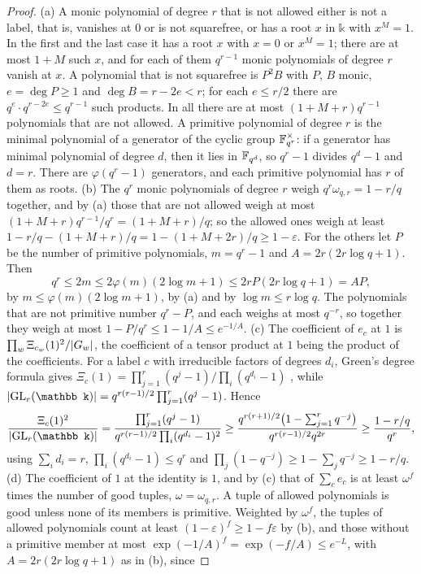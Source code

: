 \begin{proof}
(a) A monic polynomial of degree $r$ that is not allowed either is not a label, that is, vanishes at $0$ or is not squarefree, or has a root $x$ in $\mathbb k$ with $x^M=1$. In the first and the last case it has
a root $x$ with $x=0$ or $x^M=1$; there are at most $1+M$ such $x$, and for each of them $q^{r-1}$ monic polynomials of degree $r$ vanish at $x$. A polynomial that is not squarefree is $P^2B$ with $P$, $B$
monic, $e=\deg P\ge1$ and $\deg B=r-2e<r$; for each $e\le r/2$ there are $q^e\cdot q^{r-2e}\le q^{r-1}$ such products. In all there are at most $(1+M+r)q^{r-1}$ polynomials that are not allowed. A primitive
polynomial of degree $r$ is the minimal polynomial of a generator of the cyclic group $\mathbb{F}_{q^r}^\times$: if a generator has minimal polynomial of degree $d$, then it lies in $\mathbb{F}_{q^d}$, so $q^r-1$ divides $q^d-1$ and
$d=r$. There are $\varphi(q^r-1)$ generators, and each primitive polynomial has $r$ of them as roots.
(b) The $q^r$ monic polynomials of degree $r$ weigh $q^r\omega_{q,r}=1-r/q$ together, and by (a) those that are not allowed weigh at most $(1+M+r)q^{r-1}/q^r=(1+M+r)/q$; so the allowed ones weigh at least
$1-r/q-(1+M+r)/q=1-(1+M+2r)/q\ge1-\varepsilon$. For the others let $P$ be the number of primitive polynomials, $m=q^r-1$ and $A=2r(2r\log q+1)$. Then
\[
  q^r\le2m\le2\varphi(m)(2\log m+1)\le2rP(2r\log q+1)=AP,
\]
by $m\le\varphi(m)(2\log m+1)$, by (a) and by $\log m\le r\log q$. The polynomials that are not primitive number $q^r-P$, and each weighs at most $q^{-r}$, so together they weigh at most $1-P/q^r\le1-1/A\le e^{-1/A}$.
(c) The coefficient of $e_c$ at $1$ is $\prod_w\Xi_{c_w}(1)^2/\lvert G_w\rvert$, the coefficient of a tensor product at $1$ being the product of the coefficients. For a label $c$ with irreducible factors of degrees $d_i$, Green's degree formula gives
$\Xi_c(1)=\prod_{j=1}^r(q^j-1)/\prod_i(q^{d_i}-1)$ \cite{Green1955}, while $\abs{\GL_r(\mathbb k)}=q^{r(r-1)/2}\prod_{j=1}^r(q^j-1)$. Hence
\[
  \frac{\Xi_c(1)^2}{\abs{\GL_r(\mathbb k)}}=\frac{\prod_{j=1}^r(q^j-1)}{q^{r(r-1)/2}\prod_i(q^{d_i}-1)^2}\ge\frac{q^{r(r+1)/2}\bigl(1-\sum_{j=1}^{r}q^{-j}\bigr)}{q^{r(r-1)/2}q^{2r}}\ge\frac{1-r/q}{q^r},
\]
using $\sum_id_i=r$, $\prod_i(q^{d_i}-1)\le q^r$ and $\prod_j(1-q^{-j})\ge1-\sum_jq^{-j}\ge1-r/q$.
(d) The coefficient of $1$ at the identity is $1$, and by (c) that of $\sum_ce_c$ is at least $\omega^f$ times the number of good tuples, $\omega=\omega_{q,r}$. A tuple of allowed polynomials is good unless none of its
members is primitive. Weighted by $\omega^f$, the tuples of allowed polynomials count at least $(1-\varepsilon)^f\ge1-f\varepsilon$ by (b), and those without a primitive member at most $\exp(-1/A)^f=\exp(-f/A)\le e^{-L}$, with $A=2r(2r\log q+1)$ as in (b), since

\end{proof}
